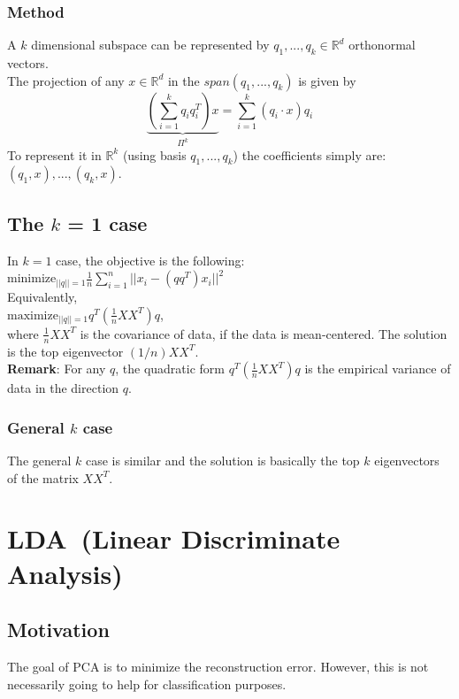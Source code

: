 \subsubsection{Method}

A $k$ dimensional subspace can be represented by $q_1,...,q_k \in
\mathbb{R}^d$ orthonormal vectors.\\ 
The projection of any $x\in \mathbb{R}^d$ in the $span(q_1,...,q_k)$
is given by 
\[
\underbrace{(\sum_{i=1}^k q_i q_i^T)x}_{\Pi^k} = \sum_{i=1}^k
(q_i\cdot x)q_i 
\]
To represent it in $\mathbb{R}^k$ (using basis $q_1,...,q_k$) the
coefficients simply are: $(q_1,x),...,(q_k,x)$.\\ 
\subsection{The $k$ = 1 case}
In $k=1$ case, the objective is the following:\\

$\textrm{minimize}_{||q||=1} \frac{1}{n} \sum_{i=1}^n
||x_i - (qq^T)x_i||^2$\\

\noindent Equivalently,\\

$\textrm{maximize}_{||q||=1}q^T(\frac{1}{n} XX^T)q$, \\

\noindent where $\frac{1}{n}XX^T$ is the covariance of data, if the
data is mean-centered. The solution is the top eigenvector
$(1/n)XX^T$.\\ 

\noindent \textbf{Remark}: For any $q$, the quadratic form
$q^T(\frac{1}{n}XX^T)q$ is the empirical variance of data in the
direction $q$. 
\subsubsection{General $k$ case}
The general $k$ case is similar and the solution is basically the top
$k$ eigenvectors of the matrix $XX^T$.\\ 

\section{LDA~(Linear Discriminate Analysis)}
\subsection{Motivation}
The goal of PCA is to minimize the reconstruction error. However, this
is not necessarily going to help for classification purposes. 
